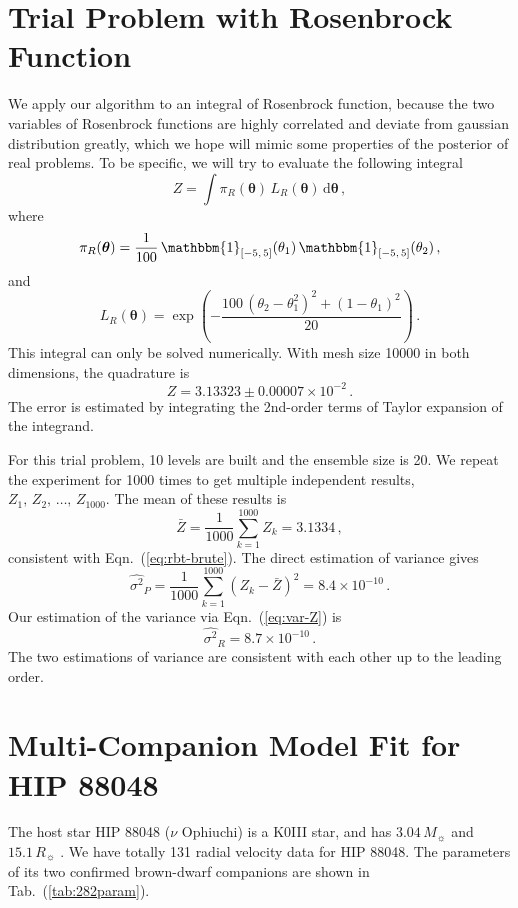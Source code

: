 \documentclass[letterpaper, preprint]{aastex}
\newcommand{\bth} {\boldsymbol \theta}
\newcommand{\md}{\mathrm{d}}
\begin{document}
\section{Trial Problem with Rosenbrock Function}
\label{sec:rosenbrock}
We apply our algorithm to an integral of Rosenbrock function, because the two variables of Rosenbrock functions are highly correlated and deviate from gaussian distribution greatly, which we hope will mimic some properties of the posterior of real problems. To be specific, we will try to evaluate the following integral
\begin{equation*}
Z=\int \pi_R(\bth)\,L_R(\bth)\,\md\bth\, ,
\end{equation*}
where
\begin{equation}
\pi_R(\bth) =\frac{1}{100}\, \mathbbm{1}_{[-5,\,5]}(\theta_1)\, \mathbbm{1}_{[-5,\,5]}(\theta_2)\, ,
\end{equation}
and
\begin{equation}
L_R(\bth) = \exp \left(  - \frac{100\,(\theta_2-\theta_1^2)^2 + (1-\theta_1)^2}{20} \right)\, .
\end{equation}
This integral can only be solved numerically. With mesh size 10000 in both dimensions, the quadrature is
\begin{equation}
Z = 3.13323 \pm 0.00007 \times 10^{-2}\, .
\label{eq:rbt-brute}
\end{equation}
The error is estimated by integrating the 2nd-order terms of Taylor expansion of the integrand.

For this trial problem, 10 levels are built and the ensemble size is 20. We repeat the experiment for 1000 times to get multiple independent results, $Z_1,\,Z_2,\,\ldots,\,Z_{1000}$. The mean of these results is
\begin{equation}
\bar{Z} = \frac{1}{1000}\sum_{k=1}^{1000}Z_k = 3.1334\, ,
\end{equation}
consistent with Eqn.~(\ref{eq:rbt-brute}). The direct estimation of variance gives
\begin{equation}
\widehat{\sigma^2}_P = \frac{1}{1000}\sum_{k=1}^{1000}(Z_k-\bar{Z})^2 = 8.4\times 10^{-10}\, .
\end{equation}
Our estimation of the variance via Eqn.~(\ref{eq:var-Z}) is
\begin{equation}
\widehat{\sigma^2}_R = 8.7\times 10^{-10}\, .
\end{equation}
The two estimations of variance are consistent with each other up to the leading order.

\section{Multi-Companion Model Fit for HIP 88048}
\label{sec:tszyj}
The host star HIP 88048 ($\nu$ Ophiuchi) is a K0III star, and has $3.04\,M_\sun$ and $15.1\,R_\sun$ \citep{sato12a}. We have totally 131 radial velocity data for HIP 88048. The parameters of its two confirmed brown-dwarf companions are shown in Tab.~(\ref{tab:282param}).
\end{document}
